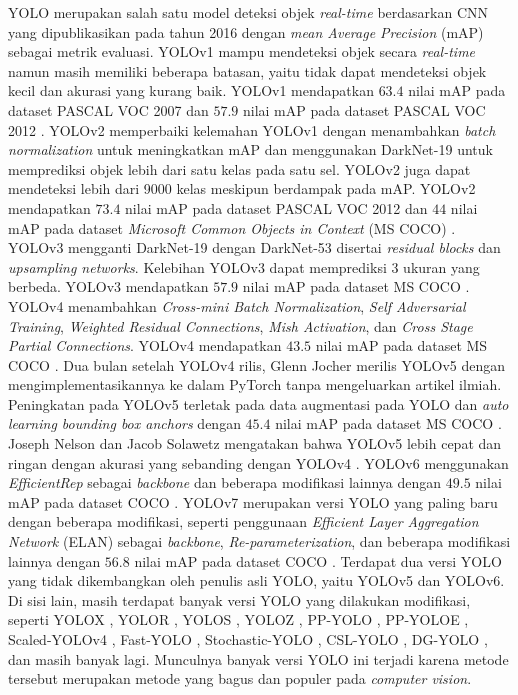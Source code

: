     YOLO merupakan salah satu model deteksi objek \textit{real-time} berdasarkan CNN yang dipublikasikan pada tahun 2016 dengan \textit{mean Average Precision} (mAP) sebagai metrik evaluasi. YOLOv1 mampu mendeteksi objek secara \textit{real-time} namun masih memiliki beberapa batasan, yaitu tidak dapat mendeteksi objek kecil dan akurasi yang kurang baik. YOLOv1 mendapatkan $63.4$ nilai mAP pada dataset PASCAL VOC 2007 dan $57.9$ nilai mAP pada dataset PASCAL VOC 2012 \citep{Redmon2016a}. YOLOv2 memperbaiki kelemahan YOLOv1 dengan menambahkan \textit{batch normalization} untuk meningkatkan mAP dan menggunakan DarkNet-19 untuk memprediksi objek lebih dari satu kelas pada satu sel. YOLOv2 juga dapat mendeteksi lebih dari 9000 kelas meskipun berdampak pada mAP. YOLOv2 mendapatkan $73.4$ nilai mAP pada dataset PASCAL VOC 2012 dan $44$ nilai mAP pada dataset \textit{Microsoft Common Objects in Context} (MS COCO) \citep{Redmon2017}. YOLOv3 mengganti DarkNet-19 dengan DarkNet-53 disertai \textit{residual blocks} dan \textit{upsampling networks}. Kelebihan YOLOv3 dapat memprediksi 3 ukuran yang berbeda. YOLOv3 mendapatkan $57.9$ nilai mAP pada dataset MS COCO \citep{Redmon2018}. YOLOv4 menambahkan \textit{Cross-mini Batch Normalization}, \textit{Self Adversarial Training}, \textit{Weighted Residual Connections}, \textit{Mish Activation}, dan \textit{Cross Stage Partial Connections}. YOLOv4 mendapatkan $43.5$ nilai mAP pada dataset MS COCO \citep{Bochkovskiy2020}. Dua bulan setelah YOLOv4 rilis, Glenn Jocher merilis YOLOv5 dengan mengimplementasikannya ke dalam PyTorch tanpa mengeluarkan artikel ilmiah. Peningkatan pada YOLOv5 terletak pada data augmentasi pada YOLO dan \textit{auto learning bounding box anchors} dengan $45.4$ nilai mAP pada dataset MS COCO \citep{Jocher2020}. Joseph Nelson dan Jacob Solawetz mengatakan bahwa YOLOv5 lebih cepat dan ringan dengan akurasi yang sebanding dengan YOLOv4 \citep{Nelson2020}. YOLOv6 menggunakan \textit{EfficientRep} sebagai \textit{backbone} dan beberapa modifikasi lainnya dengan $49.5$ nilai mAP pada dataset COCO \citep{Li2022}. YOLOv7 merupakan versi YOLO yang paling baru dengan beberapa modifikasi, seperti penggunaan \textit{Efficient Layer Aggregation Network} (ELAN) sebagai \textit{backbone}, \textit{Re-parameterization}, dan beberapa modifikasi lainnya dengan $56.8$ nilai mAP pada dataset COCO \citep{Wang2022}. Terdapat dua versi YOLO yang tidak dikembangkan oleh penulis asli YOLO, yaitu YOLOv5 dan YOLOv6. Di sisi lain, masih terdapat banyak versi YOLO yang dilakukan modifikasi, seperti YOLOX \citep{Ge2021}, YOLOR \citep{Wang}, YOLOS \citep{Fang2021b}, YOLOZ \citep{Benjumea}, PP-YOLO \citep{Long2020}, PP-YOLOE \citep{xu2022pp}, Scaled-YOLOv4 \citep{Wanga}, Fast-YOLO \citep{shafiee2017fast}, Stochastic-YOLO \cite{azevedo2020stochastic}, CSL-YOLO \citep{zhang2021csl}, DG-YOLO \citep{liu2020wqt}, dan masih banyak lagi. Munculnya banyak versi YOLO ini terjadi karena metode tersebut merupakan metode yang bagus dan populer pada \textit{computer vision}.

